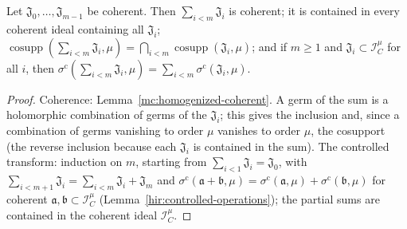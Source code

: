 \begin{lemma}
\label{mc:finite-sum}
\leanok
Let \(\mathfrak J_0,\dots,\mathfrak J_{m-1}\) be coherent. Then \(\sum_{i<m}\mathfrak J_i\) is coherent; it is contained in every coherent ideal containing all
\(\mathfrak J_i\); \(\operatorname{cosupp}(\sum_{i<m}\mathfrak J_i,\mu)=\bigcap_{i<m}\operatorname{cosupp}(\mathfrak J_i,\mu)\); and if \(m\ge1\) and
\(\mathfrak J_i\subset\mathcal I_C^\mu\) for all \(i\), then \(\sigma^{\mathrm c}(\sum_{i<m}\mathfrak J_i,\mu)=\sum_{i<m}\sigma^{\mathrm c}(\mathfrak J_i,\mu)\).
\end{lemma}
\begin{proof}
\leanok
Coherence: Lemma~\ref{mc:homogenized-coherent}. A germ of the sum is a holomorphic combination of germs of the \(\mathfrak J_i\); this gives the
inclusion and, since a combination of germs vanishing to order \(\mu\) vanishes to order \(\mu\), the cosupport (the reverse inclusion because each
\(\mathfrak J_i\) is contained in the sum). The controlled transform: induction on \(m\), starting from \(\sum_{i<1}\mathfrak J_i=\mathfrak J_0\), with
\(\sum_{i<m+1}\mathfrak J_i=\sum_{i<m}\mathfrak J_i+\mathfrak J_m\) and \(\sigma^{\mathrm c}(\mathfrak a+\mathfrak b,\mu)=\sigma^{\mathrm c}(\mathfrak a,\mu)+\sigma^{\mathrm c}(\mathfrak b,\mu)\)
for coherent \(\mathfrak a,\mathfrak b\subset\mathcal I_C^\mu\) (Lemma~\ref{hir:controlled-operations}); the partial sums are contained in the coherent ideal \(\mathcal I_C^\mu\).
\end{proof}

